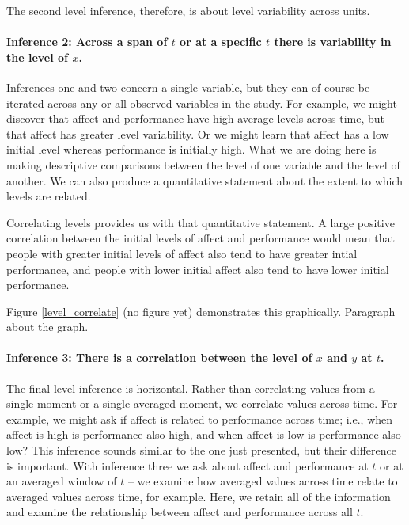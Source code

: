 \documentclass[english,,man]{apa6}
\let\oldparagraph\paragraph
\renewcommand{\paragraph}[1]{\oldparagraph{#1}\mbox{}}
\theoremstyle{definition}
\theoremstyle{definition}
\theoremstyle{definition}
\theoremstyle{remark}
\begin{document}
\noindent The second level inference, therefore, is about level
variability across units.

\hypertarget{inference-2-across-a-span-of-t-or-at-a-specific-t-there-is-variability-in-the-level-of-x.}{%
\paragraph{\texorpdfstring{Inference 2: Across a span of \(t\) or at a
specific \(t\) there is variability in the level of
\(x\).}{Inference 2: Across a span of t or at a specific t there is variability in the level of x.}}\label{inference-2-across-a-span-of-t-or-at-a-specific-t-there-is-variability-in-the-level-of-x.}}

Inferences one and two concern a single variable, but they can of course
be iterated across any or all observed variables in the study. For
example, we might discover that affect and performance have high average
levels across time, but that affect has greater level variability. Or we
might learn that affect has a low initial level whereas performance is
initially high. What we are doing here is making descriptive comparisons
between the level of one variable and the level of another. We can also
produce a quantitative statement about the extent to which levels are
related.

Correlating levels provides us with that quantitative statement. A large
positive correlation between the initial levels of affect and
performance would mean that people with greater initial levels of affect
also tend to have greater intial performance, and people with lower
initial affect also tend to have lower initial performance.

Figure \ref{level_correlate} (no figure yet) demonstrates this
graphically. Paragraph about the graph.

\hypertarget{inference-3-there-is-a-correlation-between-the-level-of-x-and-y-at-t.}{%
\paragraph{\texorpdfstring{Inference 3: There is a correlation between
the level of \(x\) and \(y\) at
\(t\).}{Inference 3: There is a correlation between the level of x and y at t.}}\label{inference-3-there-is-a-correlation-between-the-level-of-x-and-y-at-t.}}

The final level inference is horizontal. Rather than correlating values
from a single moment or a single averaged moment, we correlate values
across time. For example, we might ask if affect is related to
performance across time; i.e., when affect is high is performance also
high, and when affect is low is performance also low? This inference
sounds similar to the one just presented, but their difference is
important. With inference three we ask about affect and performance at
\(t\) or at an averaged window of \(t\) -- we examine how averaged
values across time relate to averaged values across time, for example.
Here, we retain all of the information and examine the relationship
between affect and performance across all \(t\).
\end{document}
